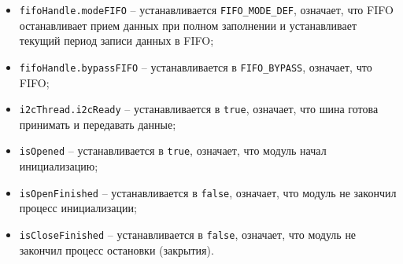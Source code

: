 \begin{itemize}
    \item \lstinline{fifoHandle.modeFIFO} -- устанавливается \lstinline{FIFO_MODE_DEF},
    означает, что FIFO останавливает прием данных при полном заполнении и устанавливает текущий период записи данных в FIFO;
    \item \lstinline{fifoHandle.bypassFIFO} -- устанавливается в \lstinline{FIFO_BYPASS}, означает, что FIFO;
    \item \lstinline{i2cThread.i2cReady} -- устанавливается в \lstinline{true}, означает, что шина готова принимать и передавать данные;
    \item \lstinline{isOpened} -- устанавливается в \lstinline{true}, означает, что модуль начал инициализацию;
    \item \lstinline{isOpenFinished} -- устанавливается в \lstinline{false}, означает, что модуль не закончил процесс инициализации;
    \item \lstinline{isCloseFinished} -- устанавливается в \lstinline{false}, означает, что модуль не закончил процесс остановки (закрытия).
\end{itemize}



